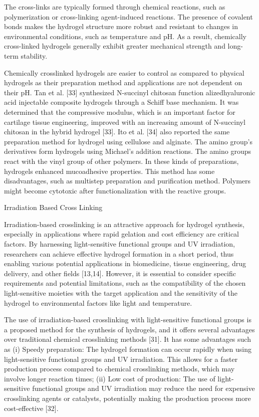 \documentclass[../../main-notes.tex]{subfiles}
\begin{document}
The cross-links are typically formed through chemical reactions, such as polymerization or cross-linking agent-induced reactions. 
The presence of covalent bonds makes the hydrogel structure more robust and resistant to changes in environmental conditions, such as temperature and pH. 
As a result, chemically cross-linked hydrogels generally exhibit greater mechanical strength and long-term stability. 

Chemically crosslinked hydrogels are easier to control as compared to physical hydrogels as their preparation method and applications are not dependent on their pH. 
Tan et al. [33] synthesized N-succinyl chitosan function alizedhyaluronic acid injectable composite hydrogels through a Schiff base mechanism. 
It was determined that the compressive modulus, which is an important factor for cartilage tissue engineering, improved with an increasing amount of N-succinyl chitosan in the hybrid hydrogel [33]. 
Ito et al. [34] also reported the same preparation method for hydrogel using cellulose and alginate. The amino group’s derivatives form hydrogels using Michael’s addition reactions. 
The amino groups react with the vinyl group of other polymers. 
In these kinds of preparations, hydrogels enhanced mucoadhesive properties. This method has some disadvantages, such as multistep preparation and purification method. Polymers might become cytotoxic after functionalization with the reactive groups.


Irradiation Based Cross Linking

Irradiation-based crosslinking is an attractive approach for hydrogel synthesis, especially in applications where rapid gelation and cost efficiency are critical factors. 
By harnessing light-sensitive functional groups and UV irradiation, researchers can achieve effective hydrogel formation in a short period, thus enabling various potential applications in biomedicine, tissue engineering, drug delivery, and other fields [13,14]. 
However, it is essential to consider specific requirements and potential limitations, such as the compatibility of the chosen light-sensitive moieties with the target application and the sensitivity of the hydrogel to environmental factors like light and temperature. 

The use of irradiation-based crosslinking with light-sensitive functional groups is a proposed method for the synthesis of hydrogels, and it offers several advantages over traditional chemical crosslinking methods [31]. 
It has some advantages such as 
    (i) Speedy preparation: The hydrogel formation can occur rapidly when using light-sensitive functional groups and UV irradiation. This allows for a faster production process compared to chemical crosslinking methods, which may involve longer reaction times; 
    (ii) Low cost of production: The use of light-sensitive functional groups and UV irradiation may reduce the need for expensive crosslinking agents or catalysts, potentially making the production process more cost-effective [32]. 
\end{document}
